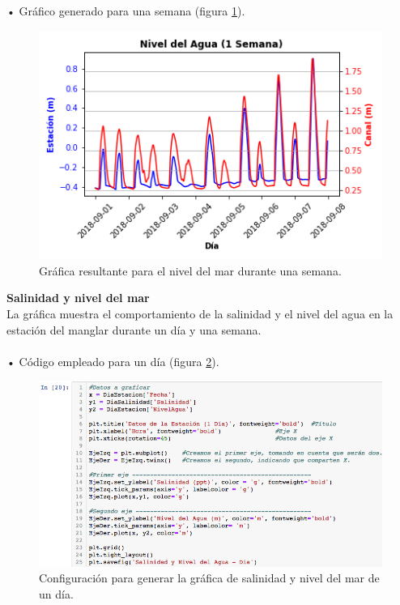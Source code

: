 \documentclass[12pt]{article}
\begin{document}
\noindent • Gráfico generado para una semana (figura \ref{fig:graf-nivel-sem}).

\begin{figure}[h!]
	\center
	\includegraphics[scale=.6]{Nivel-del-Agua-Semana}
	\caption{\label{fig:graf-nivel-sem} Gráfica resultante para el nivel del mar durante una semana.}
\end{figure}

\pagebreak

\noindent \textbf{Salinidad y nivel del mar} \\
La gráfica muestra el comportamiento de la salinidad y el nivel del agua en la estación del manglar durante un día y una semana. \\
\\
• Código empleado para un día (figura \ref{fig:cod-sal-dia}). \\

\begin{figure}[h!]
	\center
	\includegraphics[scale=.6]{./Images/sal-dia}
	\caption{\label{fig:cod-sal-dia} Configuración para generar la gráfica de salinidad y nivel del mar de un día.}
\end{figure}
\end{document}
